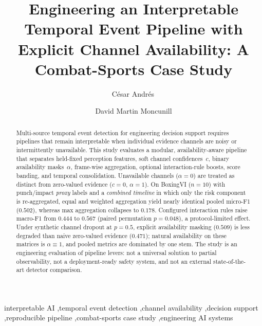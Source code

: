 \documentclass[preprint,12pt,numbers,sort&compress]{elsarticle}
\begin{document}
\begin{frontmatter}

\title{Engineering an Interpretable Temporal Event Pipeline with Explicit Channel Availability: A Combat-Sports Case Study}

\author[label=ucjc]{C\'esar Andr\'es\,}
\author[label=ucjc]{David Martin Moncunill}
\address[ucjc]{CRIA-BDHS Research Group, Higher Polytechnic School of Technology and Science,
Universidad Camilo Jos\'e Cela, Madrid, Spain}

\begin{abstract}
Multi-source temporal event detection for engineering decision support requires pipelines that remain interpretable when individual evidence channels are noisy or intermittently unavailable.
This study evaluates a modular, availability-aware pipeline that separates held-fixed perception features, soft channel confidences~$c$, binary availability masks~$\alpha$, frame-wise aggregation, optional interaction-rule boosts, score banding, and temporal consolidation.
Unavailable channels ($\alpha{=}0$) are treated as distinct from zero-valued evidence ($c{=}0$, $\alpha{=}1$).
On BoxingVI ($n{=}10$) with punch/impact \emph{proxy} labels and a \emph{combined timeline} in which only the risk component is re-aggregated, equal and weighted aggregation yield nearly identical pooled micro-F1 ($0.502$), whereas max aggregation collapses to $0.178$.
Configured interaction rules raise macro-F1 from $0.444$ to $0.567$ (paired permutation $p{=}0.048$), a protocol-limited effect.
Under synthetic channel dropout at $p{=}0.5$, explicit availability masking ($0.509$) is less degraded than naive zero-valued evidence ($0.471$); natural availability on these matrices is $\alpha{\equiv}1$, and pooled metrics are dominated by one stem.
The study is an engineering evaluation of pipeline levers: not a universal solution to partial observability, not a deployment-ready safety system, and not an external state-of-the-art detector comparison.
\end{abstract}

\begin{keyword}
interpretable AI \sep temporal event detection \sep channel availability \sep decision support \sep reproducible pipeline \sep combat-sports case study \sep engineering AI systems
\end{keyword}

\end{frontmatter}
\end{document}
